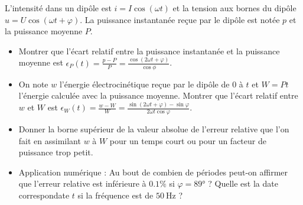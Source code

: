 	\begin{exercice}
		L'intensité dans un dipôle est $i = I\cos(\omega t)$ et la tension aux bornes du dipôle $u=U\cos(\omega t +\varphi)$. La puissance instantanée reçue par le dipôle est notée $p$ et la puissance moyenne $P$.
		\begin{itemize}
		\item Montrer que l'écart relatif entre la puissance instantanée et la puissance moyenne est $\epsilon_P(t) = \frac{p-P}{P} = \frac{\cos(2\omega t +\varphi)}{\cos\phi}$.
		\item On note $w$ l'énergie électrocinétique reçue par le dipôle de $0$ à $t$ et $W=Pt$ l'énergie calculée avec la puissance moyenne. Montrer que l'écart relatif entre $w$ et $W$ est $\epsilon_W(t) = \frac{w-W}{W} = \frac{\sin(2\omega t + \varphi)-\sin\varphi}{2\omega t \cos\varphi}$.
		\item Donner la borne supérieur de la valeur absolue de l'erreur relative que l'on fait en assimilant $w$ à $W$ pour un temps court ou pour un facteur de puissance trop petit.
		\item Application numérique : Au bout de combien de périodes peut-on affirmer que l'erreur relative est inférieure à $0.1\%$ si $\varphi=89°$ ? Quelle est la date correspondate $t$ si la fréquence est de $\SI{50}{\hertz}$ ?
		\end{itemize}
	\end{exercice}
